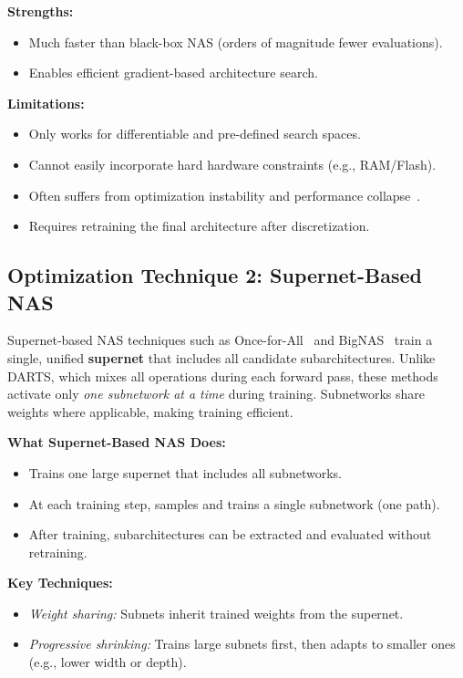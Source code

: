 \textbf{Strengths:}
\begin{itemize}
    \item Much faster than black-box NAS (orders of magnitude fewer evaluations).
    \item Enables efficient gradient-based architecture search.
\end{itemize}

\textbf{Limitations:}
\begin{itemize}
    \item Only works for differentiable and pre-defined search spaces.
    \item Cannot easily incorporate hard hardware constraints (e.g., RAM/Flash).
    \item Often suffers from optimization instability and performance collapse~\cite{zela2020understanding}.
    \item Requires retraining the final architecture after discretization.
\end{itemize}

\subsection{Optimization Technique 2: Supernet-Based NAS}
Supernet-based NAS techniques such as Once-for-All~\cite{cai2019once} and BigNAS~\cite{yu2020bignas} train a single, unified \textbf{supernet} that includes all candidate subarchitectures. Unlike DARTS, which mixes all operations during each forward pass, these methods activate only \textit{one subnetwork at a time} during training. Subnetworks share weights where applicable, making training efficient.

\textbf{What Supernet-Based NAS Does:}
\begin{itemize}
    \item Trains one large supernet that includes all subnetworks.
    \item At each training step, samples and trains a single subnetwork (one path).
    \item After training, subarchitectures can be extracted and evaluated without retraining.
\end{itemize}

\textbf{Key Techniques:}
\begin{itemize}
    \item \textit{Weight sharing:} Subnets inherit trained weights from the supernet.
    \item \textit{Progressive shrinking:} Trains large subnets first, then adapts to smaller ones (e.g., lower width or depth).
\end{itemize}

